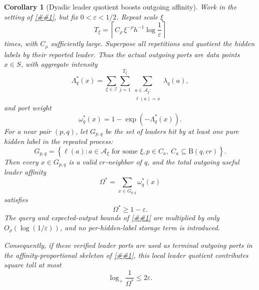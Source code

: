 \documentclass[10pt]{article}
\newcommand{\cref}[1]{\ref{##1}}
\newtheorem{corollary}[theorem]{Corollary}
\theoremstyle{definition}
\newcommand{\Ball}{\mathrm{B}}
\begin{document}
\begin{corollary}[Dyadic leader quotient boosts outgoing affinity]
   \label{cor:dyadic-leader-affinity-boost}
   Work in the setting of \cref{lem:dyadic-leader-quotient}, but fix
   \(0<\varepsilon<1/2\).  Repeat scale \(\xi\)
   \[
      T_\xi=
      \left\lceil
         C_\rho\,\xi^{-\rho}h^{-1}\log\frac1\varepsilon
      \right\rceil
      \tag{DLB0}
   \]
   times, with \(C_\rho\) sufficiently large.  Superpose all repetitions and
   quotient the hidden labels by their reported leader.  Thus the actual
   outgoing ports are data points \(x\in S\), with aggregate intensity
   \[
      \Lambda^*_q(x)
      =
      \sum_{\xi\in\mathcal I}
      \sum_{j=1}^{T_\xi}
      \sum_{\substack{a\in\mathcal A_\xi:\\ \ell(a)=x}}
      \lambda_q(a),
      \tag{DLB1}
   \]
   and port weight
   \[
      \omega^*_q(x)=1-\exp(-\Lambda^*_q(x)).
      \tag{DLB2}
   \]
   For a near pair \((p,q)\), let \(G_{p,q}\) be the set of leaders hit by at
   least one pure hidden label in the repeated process:
   \[
      G_{p,q}
      =
      \left\{
      \ell(a):
      a\in\mathcal A_\xi\text{ for some }\xi,
      p\in C_a,\ C_a\subseteq\Ball(q,cr)
      \right\}.
      \tag{DLB3}
   \]
   Then every \(x\in G_{p,q}\) is a valid \(cr\)-neighbor of \(q\), and the
   total outgoing useful leader affinity
   \[
      \Omega^*=\sum_{x\in G_{p,q}}\omega^*_q(x)
      \tag{DLB4}
   \]
   satisfies
   \[
      \Omega^*\ge1-\varepsilon .
      \tag{DLB5}
   \]
   The query and expected-output bounds of
   \cref{lem:dyadic-leader-quotient} are multiplied by only
   \(O_\rho(\log(1/\varepsilon))\), and no per-hidden-label storage term is
   introduced.

   Consequently, if these verified leader ports are used as terminal outgoing
   ports in the affinity-proportional skeleton of
   \cref{cor:affinity-proportional-route-law}, this local leader quotient
   contributes square toll at most
   \[
      \log_+\frac1{\Omega^*}\le2\varepsilon .
      \tag{DLB6}
   \]
\end{corollary}
\end{document}
